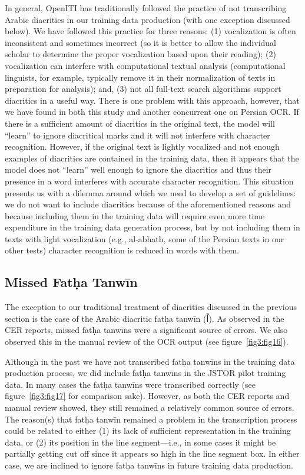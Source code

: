 In general, OpenITI has traditionally followed the practice of not transcribing
Arabic diacritics in our training data production (with one exception discussed
below). We have followed this practice for three reasons: (1) vocalization is
often inconsistent and sometimes incorrect (so it is better to allow the
individual scholar to determine the proper vocalization based upon their
reading); (2) vocalization can interfere with computational textual analysis
(computational linguists, for example, typically remove it in their
normalization of texts in preparation for analysis); and, (3) not all full-text
search algorithms support diacritics in a useful way. There is one problem with
this approach, however, that we have found in both this study and another
concurrent one on Persian OCR. If there is a sufficient amount of diacritics in
the original text, the model will “learn” to ignore diacritical marks and it
will not interfere with character recognition. However, if the original text is
lightly vocalized and not enough examples of diacritics are contained in the
training data, then it appears that the model does not “learn” well enough to
ignore the diacritics and thus their presence in a word interferes with
accurate character recognition. This situation presents us with a dilemma
around which we need to develop a set of guidelines: we do not want to include
diacritics because of the aforementioned reasons and because including them in
the training data will require even more time expenditure in the training data
generation process, but by not including them in texts with light vocalization
(e.g., al-abhath, some of the Persian texts in our other tests) character
recognition is reduced in words with them. 

\subsection{Missed Fatḥa Tanwīn}

The exception to our traditional treatment of diacritics discussed in the
previous section is the case of the Arabic diacritic fatḥa tanwīn (\textarabic{اً}). As
observed in the CER reports, missed fatḥa tanwīns were a significant source of
errors. We also observed this in the manual review of the OCR output (see
figure~\ref{fig3:fig16}).

Although in the past we have not transcribed fatḥa tanwīns in the training data
production process, we did include fatḥa tanwīns in the JSTOR pilot training
data. In many cases the fatḥa tanwīns were transcribed correctly (see
figure~\ref{fig3:fig17} for comparison sake). However, as both the CER reports
and manual review showed, they still remained a relatively common source of
errors.  The reason(s) that fatḥa tanwīn remained a problem in the
transcription process could be related to either (1) its lack of sufficient
representation in the training data, or (2) its position in the line
segment—i.e., in some cases it might be partially getting cut off since it
appears so high in the line segment box. In either case, we are inclined to
ignore fatḥa tanwīns in future training data production. 

